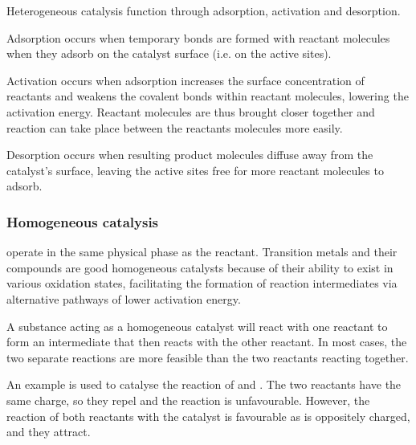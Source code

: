 \documentclass[Chemistry.tex]{subfiles}
\begin{document}
Heterogeneous catalysis function through adsorption, activation and desorption.

Adsorption occurs when temporary bonds are formed with reactant molecules when they adsorb on the catalyst surface (i.e. on the active sites).

Activation occurs when adsorption increases the surface concentration of reactants and weakens the covalent bonds within reactant molecules, lowering the activation energy. Reactant molecules are thus brought closer together and reaction can take place between the reactants molecules more easily.

Desorption occurs when resulting product molecules diffuse away from the catalyst's surface, leaving the active sites free for more reactant molecules to adsorb.
\subsubsection{Homogeneous catalysis}
 operate in the same physical phase as the reactant. Transition metals and their compounds are good homogeneous catalysts because of their ability to exist in various oxidation states, facilitating the formation of reaction intermediates via alternative pathways of lower activation energy.

A substance acting as a homogeneous catalyst will react with one reactant to form an intermediate that then reacts with the other reactant. In most cases, the two separate reactions are more feasible than the two reactants reacting together.

An example is  used to catalyse the reaction of  and . The two reactants have the same charge, so they repel and the reaction is unfavourable. However, the reaction of both reactants with the catalyst is favourable as  is oppositely charged, and they attract.
\end{document}
